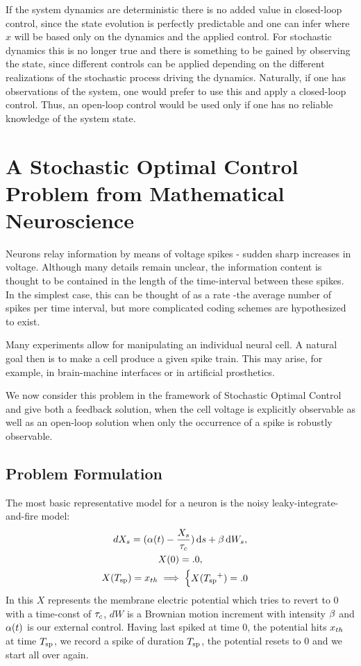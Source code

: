 \documentclass{article}
\begin{document}
If the system dynamics are deterministic there is no added value in closed-loop
control, since the state evolution is perfectly predictable and one can infer
where $x$ will be based only on the dynamics and the applied control. For
stochastic dynamics this is no longer true and there is something to be gained
by observing the state, since different controls can be applied depending on the
different realizations of the stochastic process driving the dynamics.
Naturally, if one has observations of the system, one would prefer to use this
and apply a closed-loop control. Thus, an open-loop control would be used
only if one has no reliable knowledge of the system state.


\section{A Stochastic Optimal Control Problem from Mathematical Neuroscience}
Neurons relay information by means of voltage spikes - sudden sharp increases in
voltage. Although many details remain unclear, the information content is
thought to be contained in the length of the time-interval between these spikes.
In the simplest case, this can be thought of as a rate  -the average number of
spikes per time interval, but more complicated coding schemes are hypothesized to
exist. 

Many experiments allow for manipulating an individual neural cell. A natural
goal then is to make a cell produce a given spike train. This may arise, for
example, in brain-machine interfaces or in artificial prosthetics. 

We now consider this problem in the framework of Stochastic Optimal Control and
give both a feedback solution, when the cell voltage is explicitly observable as
well as an open-loop solution when only the occurrence of a spike is
robustly observable. 

\subsection{Problem Formulation}
The most basic representative model for a neuron is the noisy
leaky-integrate-and-fire model:
\begin{equation}
\begin{gathered}
dX_s = ({\alpha}(t) - \frac{X_s}{{ \tau_{c} }} ) \, \mathrm{d} s + {\beta} \, \mathrm{d} W_s,
\\
X(0) = .0,
\\
X({ T_{\textrm{sp} } }) = { x_{th} } \implies  
\begin{cases}
X({ T_{\textrm{sp} } }^+) = .0 &  
\end{cases}
\end{gathered}
\label{eq:X_evolution_uo}
\end{equation}
In this $X$ represents the membrane electric potential which tries to revert to
$0$ with a time-const of ${ \tau_{c} }$, $dW$ is a Brownian motion increment with
intensity ${\beta}$ and ${\alpha}(t)$ is our external control. Having last spiked at
time $0$, the potential hits ${ x_{th} }$ at time ${ T_{\textrm{sp} } }$, we record a spike
of duration ${ T_{\textrm{sp} } }$, the potential resets to $0$ and we start all over again.  
\end{document}

